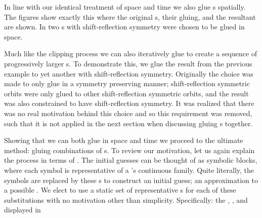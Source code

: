 In line with our identical treatment of space and time we also glue {\po}s spatially.
The figures %
show exactly this where the original {\po}s, their gluing, and the resultant {\po} are shown.
In %
two {\po}s with shift-reflection symmetry were chosen to be glued in space.

Much like the clipping process we can also iteratively glue to create a sequence of
progressively larger {\po}s. To demonstrate this, we glue the result
from the previous example to yet another {\po} with shift-reflection symmetry. Originally
the choice was made to only glue in a symmetry preserving manner; shift-reflection symmetric
orbits were only glued to other shift-reflection symmetric orbits, and the result was
also constrained to have shift-reflection symmetry. It was realized that there
was no real motivation behind this choice and so this requirement was removed, such that
it is not applied in the next section when discussing gluing {\fpo}s together.


Showing that we can both glue in space and time we proceed to
the ultimate method: gluing {\spt} combinations of {\fpo}s.
To review our motivation, let us again explain the process in terms of {\symbolic}.
The initial guesses can be thought of as symbolic blocks, where each symbol
is representative of a {\fpo}'s continuous family. Quite literally, the symbols are replaced
by these {\fpo}s to construct an initial guess; an approximation to a possible {\po}.
We elect to use a static set of
representative {\fpo}s for each of these substitutions with no motivation other
than simplicity. Specifically: the {},
{\wiggle}, and {\streak} displayed in %

